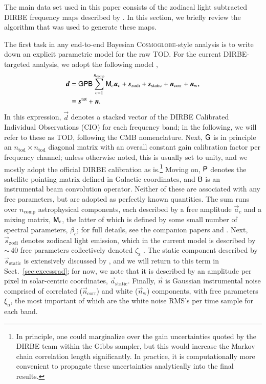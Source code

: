 \documentclass{aa}
\newcommand{\dv}[0]{\vec{d}}
\newcommand{\B}[0]{\tens{B}}
\newcommand{\G}[0]{\tens{G}}
\newcommand{\n}[0]{\vec{n}}
\newcommand{\s}[0]{\vec{s}}
\renewcommand{\a}[0]{\vec{a}}
\newcommand{\M}[0]{\tens{M}}
\renewcommand{\P}[0]{\tens{P}}
\newcommand{\cosmoglobe}{\textsc{Cosmoglobe}}
\begin{document}
The main data set used in this paper consists of the zodiacal light subtracted
DIRBE frequency maps described by \citet{CG02_01}. In this section, we
briefly review the algorithm that was used to generate these maps.


The first task in any end-to-end Bayesian \cosmoglobe-style analysis
is to write down an explicit parametric model for the raw TOD. For the current DIRBE-targeted analysis, we adopt the following
model \citep{CG02_01},
\begin{align}
	\label{eq:model}
	\dv &=\G\P\B\sum_{c=1}^{n_{\mathrm{comp}}}\M_c\a_c+\s_{\mathrm{zodi}} +
	  \s_{\mathrm{static}} + \n_\mathrm{corr}+\n_\mathrm{w},\\
        &\equiv \s^{\mathrm{tot}} + \n.
\end{align}
In this expression, $\dv$ denotes a stacked vector of the DIRBE
Calibrated Individual Observations (CIO) for each frequency band; in
the following, we will refer to these as TOD,
following the CMB nomenclature. Next, $\G$ is in principle an
$n_{\mathrm{tod}}\times n_{\mathrm{tod}}$ diagonal matrix with an
overall constant gain calibration factor per frequency channel; unless
otherwise noted, this is usually set to unity, and we mostly adopt the
official DIRBE calibration as is.\footnote{In principle, one could
marginalize over the gain uncertainties quoted by the DIRBE team
within the Gibbs sampler, but this would increase the Markov chain
correlation length significantly. In practice, it is computationally
more convenient to propagate these uncertainties analytically into the
final results.}  Moving on, $\P$ denotes the satellite pointing
matrix defined in Galactic coordinates, and $\B$ is an
instrumental beam convolution operator. Neither of these are
associated with any free parameters, but are adopted as perfectly
known quantities. The sum runs over $n_{\mathrm{comp}}$ astrophysical
components, each described by a free amplitude $\a_c$ and a mixing
matrix, $\M_c$, the latter of which is defined by some small number of
spectral parameters, $\beta_{c}$; for full details, see
the companion papers \citet{CG02_04} and \citet{CG02_05}. Next, $\s_{\mathrm{zodi}}$ denotes zodiacal
light emission, which in the current model is described by $\sim$\,40
free parameters collectively denoted $\zeta_{\mathrm{z}}$
\citep{CG02_02}. The static component described by
$\s_{\mathrm{static}}$ is extensively discussed by \citet{CG02_01},
and we will return to this term in Sect.~\ref{sec:excessrad}; for now,
we note that it is described by an amplitude per pixel in
solar-centric coordinates, $\a_{\mathrm{static}}$. Finally, $\n$
is Gaussian instrumental noise comprised of correlated ($\n_\mathrm{corr}$) and white ($\n_\mathrm{w}$) components, with free parameters
$\xi_{\mathrm{n}}$, the most important of which are the white noise
RMS's per time sample for each band.
\end{document}
